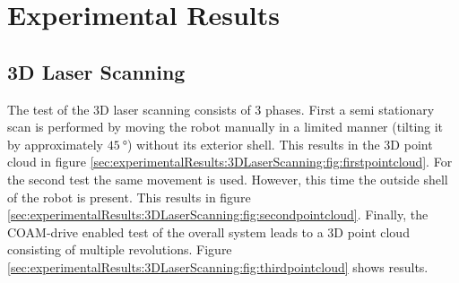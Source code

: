 \section{Experimental Results}
\label{sec:experimentalResults}

\subsection{3D Laser Scanning}
\label{sec:experimentalResults:3DLaserScanning}

The test of the 3D laser scanning consists of 3 phases.
First a semi stationary scan is performed by moving the robot manually in a limited manner (tilting it by approximately $\SI{45}{\degree}$) without its exterior shell.
This results in the 3D point cloud in figure \ref{sec:experimentalResults:3DLaserScanning:fig:firstpointcloud}.
For the second test the same movement is used.
However, this time the outside shell of the robot is present.
This results in figure \ref{sec:experimentalResults:3DLaserScanning:fig:secondpointcloud}.
Finally, the COAM-drive enabled test of the overall system leads to a 3D point cloud consisting of multiple revolutions.
Figure \ref{sec:experimentalResults:3DLaserScanning:fig:thirdpointcloud} shows results.
